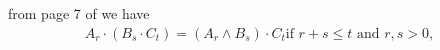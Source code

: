 from page 7 of \cite{Hestenes1984} we have
\begin{align}
 A_r \cdot \left( B_s \cdot C_t \right) = \left(  A_r \wedge B_s \right) \cdot C_t 
  \text{if $r + s \le t$ and $r,s>0$},
 \label{eqn:dot_to_wedge}
\end{align}







